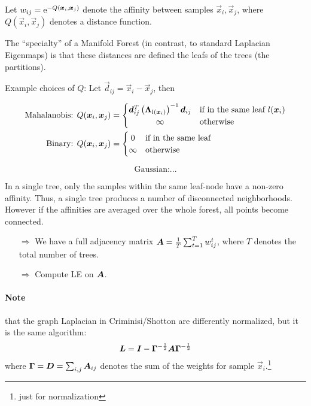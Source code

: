 Let \(w_{ij} = \mathrm{e}^{-Q(\bm{x}_i, \bm{x}_j)}\) denote the affinity between samples \(\vec{x}_i, \vec{x}_j\), where \(Q(\vec{x}_i, \vec{x}_j)\) denotes a distance function.

The ``specialty'' of a Manifold Forest (in contrast, \eg to standard Laplacian Eigenmaps) is that these distances are defined \wrt the leafs of the trees (\ie the partitions).

\bigbreak

Example choices of \(Q\): Let \(\vec{d}_{ij} = \vec{x}_i - \vec{x}_j\), then

\begin{align*}
  \text{Mahalanobis: } Q(\vec{x}_i, \vec{x}_j) &= \begin{cases} \vec{d}_{ij}^T\left(\mat{\Lambda}_{l(\vec{x}_i)}\right)^{-1}\vec{d}_{ij} & \text{if in the same leaf } l(\vec{x}_i) \\ \hfil \infty & \text{otherwise} \end{cases} \\
  \text{Binary: } Q(\vec{x}_i, \vec{x}_j) &= \begin{cases} \hfil 0 & \text{if in the same leaf} \\ \infty & \text{otherwise} \end{cases}
\end{align*}

\[\text{Gaussian:} ...\]

In a single tree, only the samples within the same leaf-node have a non-zero affinity. Thus, a single tree produces a number of disconnected neighborhoods.
However if the affinities are averaged over the whole forest, all points become connected.

\begin{itemize}
  \item[\(\Rightarrow\)] We have a full adjacency matrix \(\bm{A} = \frac{1}{T} \sum_{t=1}^T w_{ij}^t\), where \(T\) denotes the total number of trees.
  \item[\(\Rightarrow\)] Compute LE on \(\bm{A}\).
\end{itemize}

\paragraph{Note} that the graph Laplacian in Criminisi/Shotton  are differently normalized, but it is the same algorithm:
\[\bm{L} = \bm{I} - \bm{\Gamma}^{-\frac{1}{2}} \bm{A} \bm{\Gamma}^{-\frac{1}{2}}\]
where \(\bm{\Gamma} = \bm{D} = \sum_{i,j} \bm{A}_{ij}\) denotes the sum of the weights for sample \(\vec{x}_i\).\footnote{just for normalization}

